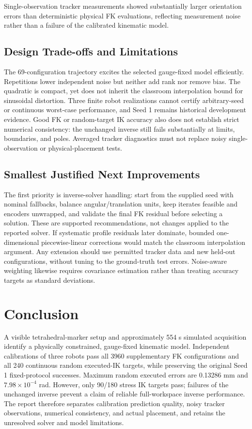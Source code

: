 \documentclass[11pt,letterpaper]{article}
\begin{document}
Single-observation tracker measurements showed substantially larger orientation errors than deterministic physical FK evaluations, reflecting measurement noise rather than a failure of the calibrated kinematic model.

\subsection{Design Trade-offs and Limitations}
The 69-configuration trajectory excites the selected gauge-fixed model efficiently. Repetitions lower independent noise but neither add rank nor remove bias. The quadratic is compact, yet does not inherit the classroom interpolation bound for sinusoidal distortion. Three finite robot realizations cannot certify arbitrary-seed or continuous worst-case performance, and Seed 1 remains historical development evidence. Good FK or random-target IK accuracy also does not establish strict numerical consistency: the unchanged inverse still fails substantially at limits, boundaries, and poles. Averaged tracker diagnostics must not replace noisy single-observation or physical-placement tests.

\subsection{Smallest Justified Next Improvements}
The first priority is inverse-solver handling: start from the supplied seed with nominal fallbacks, balance angular/translation units, keep iterates feasible and encoders unwrapped, and validate the final FK residual before selecting a solution. These are supported recommendations, not changes applied to the reported solver. If systematic profile residuals later dominate, bounded one-dimensional piecewise-linear corrections would match the classroom interpolation argument. Any extension should use permitted tracker data and new held-out configurations, without tuning to the ground-truth test errors. Noise-aware weighting likewise requires covariance estimation rather than treating accuracy targets as standard deviations.

\section{Conclusion}\label{sec:conclusion}
A visible tetrahedral-marker setup and approximately 554 s simulated acquisition identify a physically constrained, gauge-fixed kinematic model. Independent calibrations of three robots pass all 3960 supplementary FK configurations and all 240 continuous random executed-IK targets, while preserving the original Seed 1 fixed-protocol successes. Maximum random executed errors are 0.13286 mm and $7.98\times10^{-4}$ rad. However, only 90/180 stress IK targets pass; failures of the unchanged inverse prevent a claim of reliable full-workspace inverse performance. The report therefore separates calibration prediction quality, noisy tracker observations, numerical consistency, and actual placement, and retains the unresolved solver and model limitations.
\end{document}
